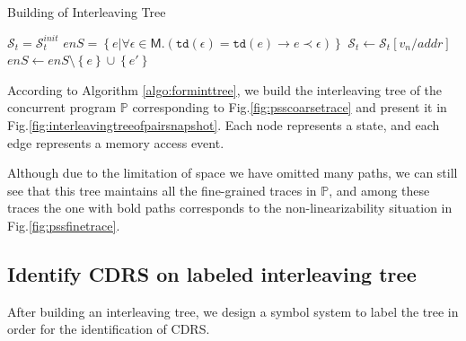 \documentclass[runningheads]{llncs}
\newcommand{\pair}[1]{{\langle{#1}\rangle}}
\newcommand{\sset}[1]{\left\{{#1}\right\}}
\begin{document}
\vspace{-0.5cm}


\begin{algorithm}
    \caption{Building of Interleaving Tree}\label{algo:forminttree}
    \begin{algorithmic}[1]
        \State $\mathcal{S}_t = \mathcal{S}_t^{init}$ 
        \State $\mathit{enS} = \left\{ e | \forall \epsilon\in \mathsf{M} .(\mathtt{td}(\epsilon)=\mathtt{td}(e)\longrightarrow e\prec \epsilon)\right\}$ 
            \State {}
            \For{$e(addr,v_n)^{\pair{o,t}} \leftarrow \mathit{enS}$}
                \State {}
                \State $\mathcal{S}_t \gets \mathit{\mathcal{S}_t[v_n/addr]}$ 
                \State $\mathit{enS} \gets \mathit{enS}\setminus \sset{e} \cup \sset{e'}$ 
                \State {} 
            \EndFor
        \EndFunction
    \end{algorithmic}
\end{algorithm}

\vspace{-0.8cm}

\begin{example} 
According to Algorithm \ref{algo:forminttree}, we build the interleaving tree of the concurrent program $\mathbb{P}$ corresponding to Fig.\ref{fig:psscoarsetrace} and present it in Fig.\ref{fig:interleavingtreeofpairsnapshot}. Each node represents a state, and each edge represents a memory access event.

Although due to the limitation of space we have omitted many paths, we can still see that this tree maintains all the fine-grained traces in $\mathbb{P}$, and among these traces the one with bold paths corresponds to 
the non-linearizability situation in Fig.\ref{fig:pssfinetrace}.



\end{example}






\subsection{Identify CDRS on labeled interleaving tree}\label{sec:identifycdrs}
After building an interleaving tree, we design a symbol system to label the tree in order for the identification of CDRS.
\end{document}
